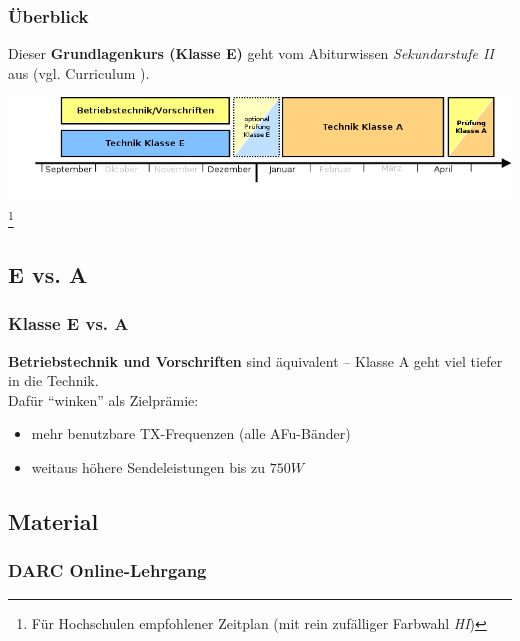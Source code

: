 \begin{frame}
    \frametitle{Überblick}

    Dieser \textbf{Grundlagenkurs (Klasse E)} geht vom Abiturwissen
    \emph{Sekundarstufe II} aus (vgl. Curriculum \hyperlink{refs}{\cite{curr}}).

    \vspace{2em}

    \includegraphics[width=1\textwidth]{o00/Zeitstrahl_D23_2017.png}\footnote{Für
    Hochschulen empfohlener Zeitplan \tiny (mit rein zufälliger Farbwahl \emph{HI})}

\end{frame}

\subsection{E vs. A}

\begin{frame}
    \frametitle{Klasse E vs. A}

    \textbf{Betriebstechnik und Vorschriften} sind äquivalent -- Klasse A geht
    viel tiefer in die Technik. \\[2em]

    Dafür "`winken"' als Zielprämie:

    \begin{itemize}
        \item mehr benutzbare TX-Frequenzen (alle AFu-Bänder)
        \item weitaus höhere Sendeleistungen bis zu $750W$
    \end{itemize}

\end{frame}

\subsection{Material}

\subsubsection[DARC-Lehrgang]{DARC Online-Lehrgang}

